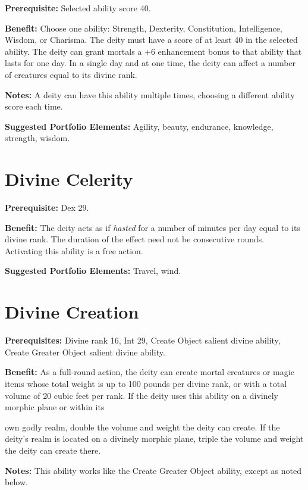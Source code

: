 \documentclass{article}
\begin{document}
\textbf{Prerequisite:} Selected ability score 40.

\textbf{Benefit:} Choose one ability: Strength, Dexterity, Constitution, Intelligence, 
Wisdom, or Charisma. The deity must have a score of at least 40 in the selected 
ability. The deity can grant mortals a +6 enhancement bonus to that ability that 
lasts for one day. In a single day and at one time, the deity can affect a number 
of creatures equal to its divine rank.

\textbf{Notes:} A deity can have this ability multiple times, choosing a different 
ability score each time.

\textbf{Suggested Portfolio Elements:} Agility, beauty, endurance, knowledge, strength, 
wisdom.

\vspace{12pt}
\section*{Divine Celerity}

\textbf{Prerequisite:} Dex 29.

\textbf{Benefit:} The deity acts as if \textit{hasted }for a number of minutes 
per day equal to its divine rank. The duration of the effect need not be consecutive 
rounds. Activating this ability is a free action.

\textbf{Suggested Portfolio Elements:} Travel, wind.

\vspace{12pt}
\section*{Divine Creation}

\textbf{Prerequisites:} Divine rank 16, Int 29, Create Object salient divine ability, 
Create Greater Object salient divine ability.

\textbf{Benefit:} As a full-round action, the deity can create mortal creatures 
or magic items whose total weight is up to 100 pounds per divine rank, or with 
a total volume of 20 cubic feet per rank. If the deity uses this ability on a divinely 
morphic plane or within its

own godly realm, double the volume and weight the deity can create. If the deity's 
realm is located on a divinely morphic plane, triple the volume and weight the 
deity can create there.

\textbf{Notes:} This ability works like the Create Greater Object ability, except 
as noted below.
\end{document}
